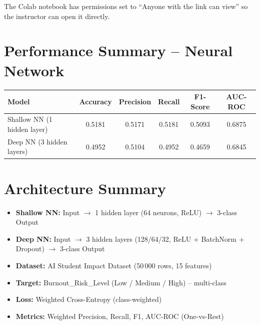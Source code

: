 \documentclass[11pt]{article}
\begin{document}
\noindent The Colab notebook has permissions set to ``Anyone with the link can view''
so the instructor can open it directly.

\section*{Performance Summary -- Neural Network}

\begin{center}
\begin{tabular}{lccccc}
\toprule
\textbf{Model} & \textbf{Accuracy} & \textbf{Precision} & \textbf{Recall} & \textbf{F1-Score} & \textbf{AUC-ROC} \\
\midrule
Shallow NN (1 hidden layer) & 0.5181 & 0.5171 & 0.5181 & 0.5093 & 0.6875 \\
Deep NN (3 hidden layers)   & 0.4952 & 0.5104 & 0.4952 & 0.4659 & 0.6845 \\
\bottomrule
\end{tabular}
\end{center}

\section*{Architecture Summary}

\begin{itemize}[leftmargin=*]
    \item \textbf{Shallow NN:} Input $\rightarrow$ 1 hidden layer (64 neurons, ReLU) $\rightarrow$ 3-class Output
    \item \textbf{Deep NN:} Input $\rightarrow$ 3 hidden layers (128/64/32, ReLU + BatchNorm + Dropout) $\rightarrow$ 3-class Output
    \item \textbf{Dataset:} AI Student Impact Dataset (50\,000 rows, 15 features)
    \item \textbf{Target:} Burnout\_Risk\_Level (Low / Medium / High) -- multi-class
    \item \textbf{Loss:} Weighted Cross-Entropy (class-weighted)
    \item \textbf{Metrics:} Weighted Precision, Recall, F1, AUC-ROC (One-vs-Rest)
\end{itemize}

\vfill

\end{document}
